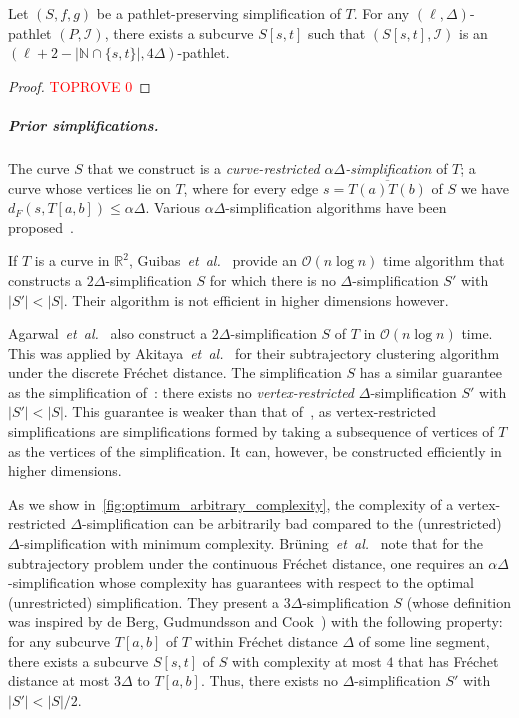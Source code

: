\documentclass[a4paper,UKenglish,cleveref,thm-restate,notab]{lipics-v2021}
\makeatletter
\newcommand{\etal}{\textit{et~al.\@}\xspace}
\newcommand{\f}{Fr\'echet\xspace}
\newcommand{\dF}{\ensuremath{d_F}}
\newcommand{\bigO}{\mathcal{O}}
\newcommand{\N}{\mathbb{N}}
\newcommand{\I}{\mathcal{I}}
\makeatother
\begin{document}
    \begin{theorem}
        \label{thm:property_S}
        Let $(S, f, g)$ be a pathlet-preserving simplification of $T$. 
        For any $(\ell, \Delta)$-pathlet $(P, \I)$, there exists a subcurve $S[s, t]$ such that $(S[s, t], \I)$ is an $(\ell +2 - |\N \cap \{s, t\}|, 4\Delta)$-pathlet.
    \end{theorem}
    \begin{proof}\textcolor{red}{TOPROVE 0}\end{proof}
        
\subparagraph*{Prior simplifications.}
    The curve $S$ that we construct is a \emph{curve-restricted $\alpha \Delta$-simplification} of $T$; a curve whose vertices lie on $T$, where for every edge $s = \overline{T(a) T(b)}$ of $S$ we have $\dF(s, T[a, b]) \leq \alpha \Delta$. 
    Various $\alpha \Delta$-simplification algorithms have been proposed~\cite{guibas93minimum_link, agarwal_near-linear_2005, de_berg_fast_2013, van2018global}.
    
    If $T$ is a curve in $\mathbb{R}^2$, Guibas~\etal~\cite{guibas93minimum_link} provide an $\bigO(n \log n)$ time algorithm that constructs a $2 \Delta$-simplification $S$ for which there is no $\Delta$-simplification $S'$ with $|S'| < |S|$.
    Their algorithm is not efficient in higher dimensions however.
    
    Agarwal~\etal~\cite{agarwal_near-linear_2005} also construct a $2\Delta$-simplification $S$ of $T$ in $\bigO(n \log n)$ time. This was applied by Akitaya~\etal~\cite{bruning_subtrajectory_2023} for their subtrajectory clustering algorithm under the discrete \f distance. 
    The simplification $S$ has a similar guarantee as the simplification of~\cite{guibas93minimum_link}: there exists no \emph{vertex-restricted} $\Delta$-simplification $S'$ with $|S'| < |S|$.
    This guarantee is weaker than that of~\cite{guibas93minimum_link}, as vertex-restricted simplifications are simplifications formed by taking a subsequence of vertices of $T$ as the vertices of the simplification.
    It can, however, be constructed efficiently in higher dimensions.
    
    As we show in~\cref{fig:optimum_arbitrary_complexity}, the complexity of a vertex-restricted $\Delta$-simplification can be arbitrarily bad compared to the (unrestricted) $\Delta$-simplification with minimum complexity. 
    Br\"{u}ning~\etal~\cite{bruning_faster_2022} note that for the subtrajectory problem under the continuous \f distance, one requires an $\alpha \Delta$-simplification whose complexity has guarantees with respect to the optimal (unrestricted) simplification.
    They present a $3 \Delta$-simplification $S$ (whose definition was inspired by de Berg, Gudmundsson and Cook~\cite{de_berg_fast_2013}) with the following property:
    for any subcurve $T[a, b]$ of $T$ within \f distance $\Delta$ of some line segment, there exists a subcurve $S[s, t]$ of $S$ with complexity at most $4$ that has \f distance at most $3\Delta$ to $T[a, b]$.
    Thus, there exists no $\Delta$-simplification $S'$ with $|S'| < |S|/2$. 
        
\end{document}
